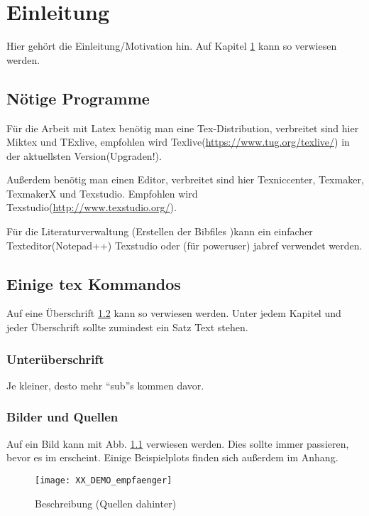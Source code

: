 
\chapter{Einleitung}\label{Einleitung}
Hier gehört die Einleitung/Motivation hin. Auf Kapitel \ref{Einleitung} kann so verwiesen werden.

\section{Nötige Programme}
Für die Arbeit mit Latex benötig man eine Tex-Distribution, verbreitet sind hier Miktex und TExlive, empfohlen wird Texlive(\url{https://www.tug.org/texlive/}) in der aktuellsten Version(Upgraden!).

Außerdem benötig man einen Editor, verbreitet sind hier Texniccenter, Texmaker, TexmakerX und Texstudio. Empfohlen wird Texstudio(\url{http://www.texstudio.org/}).

Für die Literaturverwaltung (Erstellen der Bibfiles )kann ein einfacher Texteditor(Notepad++) Texstudio oder (für poweruser) jabref  verwendet werden.


\section{Einige tex Kommandos}\label{sec:texkommandos}

Auf eine Überschrift \ref{sec:texkommandos} kann so verwiesen werden. Unter jedem Kapitel und jeder Überschrift sollte zumindest ein Satz Text stehen.

\subsection{Unterüberschrift}
Je kleiner, desto mehr "`sub"'s kommen davor.

\subsection{Bilder und Quellen}

Auf ein Bild kann mit Abb. \ref{fig:textreferenz} verwiesen werden. Dies sollte immer passieren, bevor es im erscheint. Einige Beispielplots finden sich außerdem im Anhang.

\begin{figure}[h] %
\centering
\texttt{[image: XX\_DEMO\_empfaenger]} %
\caption{Beschreibung (Quellen dahinter) \cite{BibDEMO1}\cite{BibDEMO2}}
\label{fig:textreferenz}
\end{figure}

